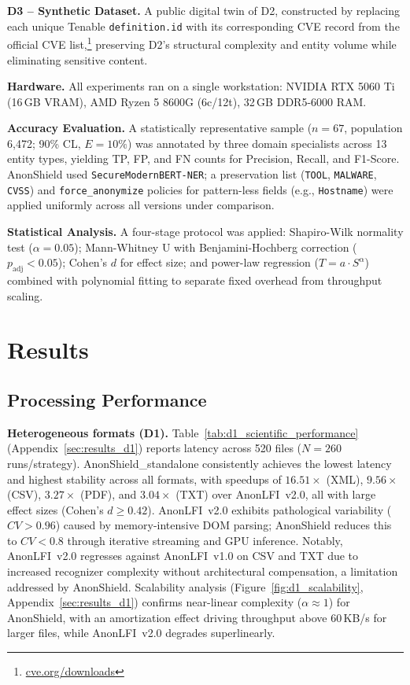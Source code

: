 \documentclass[12pt]{article}
\begin{document}
\textbf{D3 -- Synthetic Dataset.}
A public digital twin of D2, constructed by replacing each unique Tenable
\texttt{definition.id} with its corresponding CVE record from the official CVE
list,\footnote{\url{cve.org/downloads}} preserving D2's structural complexity and
entity volume while eliminating sensitive content.

\textbf{Hardware.}
All experiments ran on a single workstation: NVIDIA RTX 5060 Ti (16\,GB VRAM),
AMD Ryzen 5 8600G (6c/12t), 32\,GB DDR5-6000 RAM.

\textbf{Accuracy Evaluation.}
A statistically representative sample ($n{=}67$, population 6{,}472; 90\% CL,
$E{=}10\%$) was annotated by three domain specialists across 13 entity types,
yielding TP, FP, and FN counts for Precision, Recall, and F1-Score. AnonShield
used \texttt{SecureModernBERT-NER}; a preservation list (\texttt{TOOL},
\texttt{MALWARE}, \texttt{CVSS}) and \texttt{force\_anonymize} policies for
pattern-less fields (e.g., \texttt{Hostname}) were applied uniformly across all
versions under comparison.

\textbf{Statistical Analysis.}
A four-stage protocol was applied: Shapiro-Wilk normality test ($\alpha{=}0.05$);
Mann-Whitney U with Benjamini-Hochberg correction ($p_{\text{adj}}{<}0.05$);
Cohen's $d$ for effect size; and power-law regression ($T{=}a{\cdot}S^{\alpha}$)
combined with polynomial fitting to separate fixed overhead from throughput scaling.

\section{Results}
\label{sec:results}

\subsection{Processing Performance}

\textbf{Heterogeneous formats (D1).}
Table~\ref{tab:d1_scientific_performance} (Appendix~\ref{sec:results_d1})
reports latency across 520 files ($N{=}260$ runs/strategy).
AnonShield\_standalone consistently achieves the lowest latency and highest
stability across all formats, with speedups of $16.51\times$ (XML),
$9.56\times$ (CSV), $3.27\times$ (PDF), and $3.04\times$ (TXT) over
AnonLFI~v2.0, all with large effect sizes (Cohen's $d \geq 0.42$).
AnonLFI~v2.0 exhibits pathological variability ($CV > 0.96$) caused by
memory-intensive DOM parsing; AnonShield reduces this to $CV < 0.8$ through
iterative streaming and GPU inference. Notably, AnonLFI~v2.0 regresses against
AnonLFI~v1.0 on CSV and TXT due to increased recognizer complexity without
architectural compensation, a limitation addressed by AnonShield.
Scalability analysis (Figure~\ref{fig:d1_scalability}, Appendix~\ref{sec:results_d1})
confirms near-linear complexity ($\alpha \approx 1$) for AnonShield, with an
amortization effect driving throughput above 60\,KB/s for larger files, while
AnonLFI~v2.0 degrades superlinearly.
\end{document}
